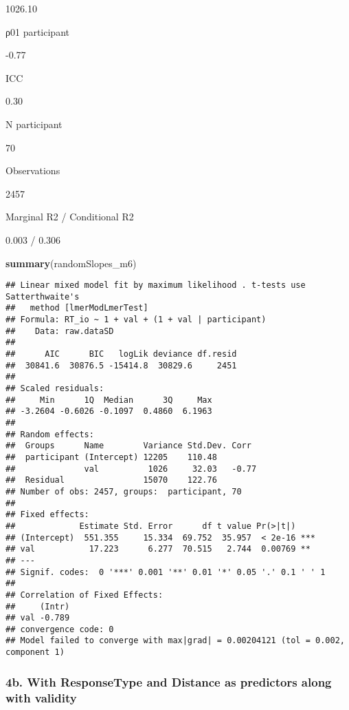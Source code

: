 \documentclass[
]{article}
\newenvironment{Shaded}{\begin{snugshade}}{\end{snugshade}}
\newcommand{\KeywordTok}[1]{\textcolor[rgb]{0.13,0.29,0.53}{\textbf{#1}}}
\newcommand{\NormalTok}[1]{#1}
\begin{document}
1026.10

ρ01 participant

-0.77

ICC

0.30

N participant

70

Observations

2457

Marginal R2 / Conditional R2

0.003 / 0.306

\begin{Shaded}
\begin{Highlighting}[]
\KeywordTok{summary}\NormalTok{(randomSlopes_m6)}
\end{Highlighting}
\end{Shaded}

\begin{verbatim}
## Linear mixed model fit by maximum likelihood . t-tests use Satterthwaite's
##   method [lmerModLmerTest]
## Formula: RT_io ~ 1 + val + (1 + val | participant)
##    Data: raw.dataSD
## 
##      AIC      BIC   logLik deviance df.resid 
##  30841.6  30876.5 -15414.8  30829.6     2451 
## 
## Scaled residuals: 
##     Min      1Q  Median      3Q     Max 
## -3.2604 -0.6026 -0.1097  0.4860  6.1963 
## 
## Random effects:
##  Groups      Name        Variance Std.Dev. Corr 
##  participant (Intercept) 12205    110.48        
##              val          1026     32.03   -0.77
##  Residual                15070    122.76        
## Number of obs: 2457, groups:  participant, 70
## 
## Fixed effects:
##             Estimate Std. Error      df t value Pr(>|t|)    
## (Intercept)  551.355     15.334  69.752  35.957  < 2e-16 ***
## val           17.223      6.277  70.515   2.744  0.00769 ** 
## ---
## Signif. codes:  0 '***' 0.001 '**' 0.01 '*' 0.05 '.' 0.1 ' ' 1
## 
## Correlation of Fixed Effects:
##     (Intr)
## val -0.789
## convergence code: 0
## Model failed to converge with max|grad| = 0.00204121 (tol = 0.002, component 1)
\end{verbatim}

\hypertarget{b.-with-responsetype-and-distance-as-predictors-along-with-validity}{%
\subsubsection{4b. With ResponseType and Distance as predictors along
with
validity}\label{b.-with-responsetype-and-distance-as-predictors-along-with-validity}}
\end{document}
